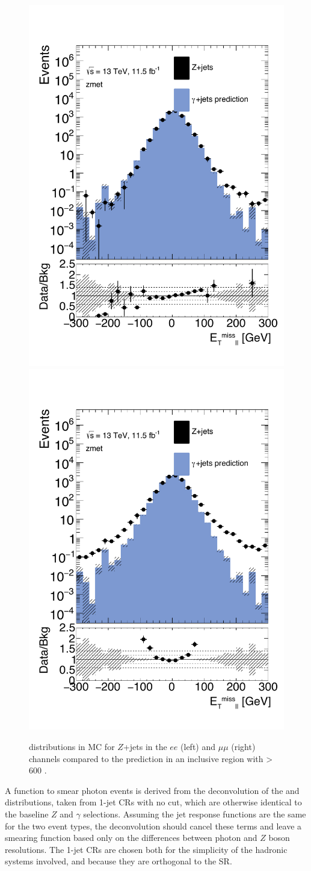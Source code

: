 \begin{centering}
\begin{figure}[!hbt]
\myfloatalign
\includegraphics[width=.48\linewidth]{figures/photons/MC_hist_METl_Pt_0_ee_2j_2016_mcmetl_ptrw__zmet_.pdf}
\includegraphics[width=.48\linewidth]{figures/photons/MC_hist_METl_Pt_0_mm_2j_2016_mcmetl_ptrw__zmet_.pdf}
\caption{\metl distributions in \ac{MC} for $Z$+jets in the $ee$ (left) and $\mu\mu$ (right) channels compared to the \gjets prediction in an inclusive region with \HT > 600 \gev.}
\label{fig:photon_metparallel}
\end{figure}
\end{centering}

A function to smear photon events is derived from the deconvolution of the \gjets and \dyjets \metl distributions, taken from 1-jet \acp{CR} with no \HT cut, which are otherwise identical to the baseline $Z$ and $\gamma$ selections. Assuming the jet response functions are the same for the two event types, the deconvolution should cancel these terms and leave a smearing function based only on the differences between photon and $Z$ boson resolutions. The 1-jet \acp{CR} are chosen both for the simplicity of the hadronic systems involved, and because they are orthogonal to the \ac{SR}.  

